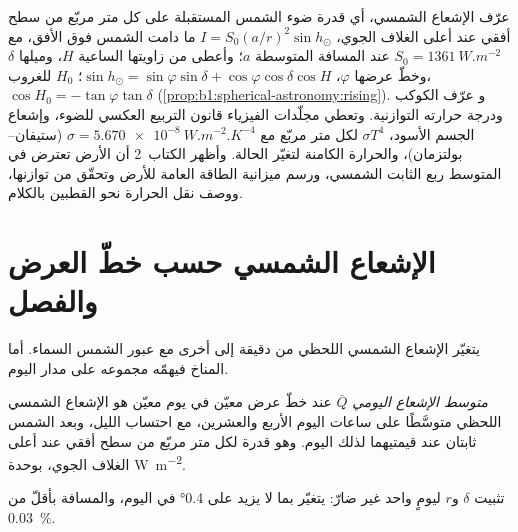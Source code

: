 \begin{recall}
 عرّف الإشعاع الشمسي، أي قدرة ضوء الشمس المستقبلة على كل متر مربّع من سطح أفقي عند أعلى الغلاف الجوي، $I = S_0(a/r)^2\sin h_\odot$ ما دامت الشمس فوق الأفق، مع $S_0 = \qty{1361}{W.m^{-2}}$ عند المسافة المتوسطة $a$؛ وأعطى  من زاويتها الساعية $H$، وميلها $\delta$ وخطّ عرضها $\varphi$، $\sin h_\odot = \sin\varphi\sin\delta + \cos\varphi\cos\delta\cos H$؛  $H_0$ للغروب، $\cos H_0 = -\tan\varphi\tan\delta$ (\cref{prop:b1:spherical-astronomy:rising}). و عرّف  الكوكب ودرجة حرارته التوازنية. وتعطي مجلّدات الفيزياء قانون التربيع العكسي للضوء، وإشعاع الجسم الأسود، $\sigma T^4$ لكل متر مربّع مع $\sigma = \qty{5.670e-8}{W.m^{-2}.K^{-4}}$ (ستيفان--بولتزمان)، والحرارة الكامنة لتغيّر الحالة. وأظهر الكتاب~2 أن الأرض تعترض في المتوسط ربع الثابت الشمسي، ورسم ميزانية الطاقة العامة للأرض وتحقّق من توازنها، ووصف نقل الحرارة نحو القطبين بالكلام.
\end{recall}

\section{الإشعاع الشمسي حسب خطّ العرض والفصل}\label{sec:b1:radiation-heat-transport:insolation}

يتغيّر الإشعاع الشمسي اللحظي من دقيقة إلى أخرى مع عبور الشمس السماء. أما المناخ فيهمّه مجموعه على مدار اليوم.

\begin{definition}\label{def:b1:radiation-heat-transport:daily-insolation}
\emph{متوسط الإشعاع اليومي} $\bar Q$ عند خطّ عرض معيّن في يوم معيّن هو الإشعاع الشمسي اللحظي متوسَّطًا على ساعات اليوم الأربع والعشرين، مع احتساب الليل،  وبعد الشمس ثابتان عند قيمتيهما لذلك اليوم. وهو قدرة لكل متر مربّع من سطح أفقي عند أعلى الغلاف الجوي، بوحدة \unit{W.m^{-2}}.
\end{definition}

تثبيت $\delta$ و$r$ ليومٍ واحد غير ضارّ:  يتغيّر بما لا يزيد على \ang{0.4} في اليوم، والمسافة بأقلّ من \qty{0.03}{\percent}.

